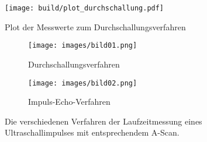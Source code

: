 \begin{figure}
    \centering
    \texttt{[image: build/plot\_durchschallung.pdf]}
    \caption{Plot der Messwerte zum Durchschallungsverfahren}
    \label{fig:durch}
\end{figure}

\begin{figure}
    \centering
    \begin{subfigure}{0.3\textwidth}
        \centering
        \texttt{[image: images/bild01.png]}
        \caption{Durchschallungsverfahren}
        \label{fig:durchschallung}
    \end{subfigure}
    \begin{subfigure}{0.3\textwidth}
        \centering
        \texttt{[image: images/bild02.png]}
        \caption{Impuls-Echo-Verfahren}
        \label{fig:impuls-echo}
    \end{subfigure}
    \caption{Die verschiedenen Verfahren der Laufzeitmessung eines Ultraschallimpulses mit entsprechendem A-Scan.\cite{US1}}
    \label{fig:verfahren}
\end{figure}